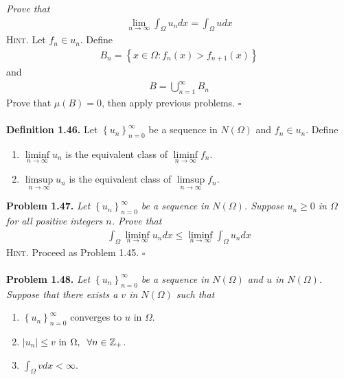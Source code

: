 \documentclass[a4paper]{article}
\numberwithin{equation}{section}
\begin{document}
\textit{Prove that}
\begin{align}
\mathop {\lim }\limits_{n \to \infty } \int_\Omega  {{u_n}dx}  = \int_\Omega  {udx} 
\end{align}
\textsc{Hint.} Let $f_n\in u_n$. Define
\begin{align}
{B_n} = \left\{ {x \in \Omega :{f_n}\left( x \right) > {f_{n + 1}}\left( x \right)} \right\}
\end{align}
and
\begin{align}
B = \bigcup\limits_{n = 1}^\infty  {{B_n}} 
\end{align}
Prove that $\mu \left(B\right) =0$, then apply previous problems. \hfill $\square$\\
\\
\textbf{Definition 1.46.} Let $\left\{ {{u_n}} \right\}_{n = 0}^\infty $ be a sequence in $N\left(\Omega\right)$ and $f_n\in u_n$. Define
\begin{enumerate}
\item $\mathop {\lim \inf }\limits_{n \to \infty } {u_n}$ is the equivalent class of $\mathop {\lim \inf }\limits_{n \to \infty } {f_n}$.
\item $\mathop {\lim \sup }\limits_{n \to \infty } {u_n}$ is the equivalent class of $\mathop {\lim \sup }\limits_{n \to \infty } {f_n}$.
\end{enumerate}
\textbf{Problem 1.47.} \textit{Let $\left\{ {{u_n}} \right\}_{n = 0}^\infty $ be a sequence in $N\left(\Omega\right)$. Suppose $u_n\ge 0$ in $\Omega$ for all positive integers $n$. Prove that}
\begin{align}
\int_\Omega  {\mathop {\lim \inf }\limits_{n \to \infty } {u_n}dx}  \le \mathop {\lim \inf }\limits_{n \to \infty } \int_\Omega  {{u_n}dx} 
\end{align}
\textsc{Hint.} Proceed as Problem 1.45. \hfill $\square$\\
\\
\textbf{Problem 1.48.} \textit{Let $\left\{ {{u_n}} \right\}_{n = 0}^\infty $ be a sequence in $N\left(\Omega\right)$ and $u$ in $N\left(\Omega\right)$. Suppose that there exists a $v$ in $N\left(\Omega\right)$ such that}
\begin{enumerate}
\item $\left\{ {{u_n}} \right\}_{n = 0}^\infty $ converges to $u$ in $\Omega$.
\item $\left| {{u_n}} \right| \le v$ in $\Omega,\hspace{0.2cm} \forall n \in {\mathbb{Z}_ + }$.
\item $\int_\Omega  {vdx}  < \infty $.
\end{enumerate}
\end{document}

